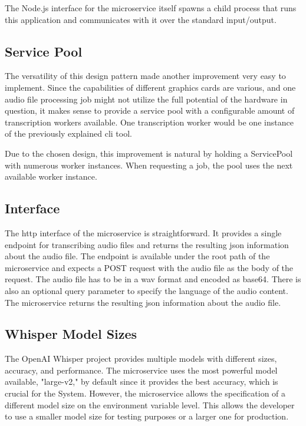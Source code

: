 The Node.js interface for the microservice itself spawns a child process that runs this application and communicates 
with it over the standard input/output.

\subsection{Service Pool}

The versatility of this design pattern made another improvement very easy to implement. Since the capabilities of 
different graphics cards are various, and one audio file processing job might not utilize the full potential of the 
hardware in question, it makes sense to provide a service pool with a configurable amount of transcription workers 
available. One transcription worker would be one instance of the previously explained \ac{cli} tool.

Due to the chosen design, this improvement is natural by holding a ServicePool with numerous worker instances. When 
requesting a job, the pool uses the next available worker instance.

\subsection{Interface}

The \ac{http} interface of the microservice is straightforward. It provides a single endpoint for transcribing audio 
files and returns the resulting \ac{json} information about the audio file. The endpoint is available under the root 
path of the microservice and expects a POST request with the audio file as the body of the request. The audio file has 
to be in a \ac{wav} format and encoded as base64. There is also an optional query parameter to specify the language of 
the audio content. The microservice returns the resulting \ac{json} information about the audio file.

\subsection{Whisper Model Sizes}

The OpenAI Whisper project provides multiple models with different sizes, accuracy, and performance. The microservice 
uses the most powerful model available, "large-v2," by default since it provides the best accuracy, which is crucial 
for the System. However, the microservice allows the specification of a different model size on the environment 
variable level. This allows the developer to use a smaller model size for testing purposes or a larger one for 
production.

